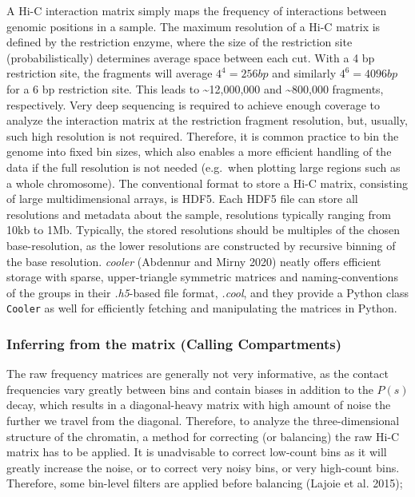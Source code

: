 \documentclass[
  11pt,
  a4paper,
]{scrbook}
\begin{document}
A Hi-C interaction matrix simply maps the frequency of interactions
between genomic positions in a sample. The maximum resolution of a Hi-C
matrix is defined by the restriction enzyme, where the size of the
restriction site (probabilistically) determines average space between
each cut. With a 4 bp restriction site, the fragments will average
\(4^4 = 256 bp\) and similarly \(4^6 = 4096 bp\) for a 6 bp restriction
site. This leads to \textasciitilde12,000,000 and \textasciitilde800,000
fragments, respectively. Very deep sequencing is required to achieve
enough coverage to analyze the interaction matrix at the restriction
fragment resolution, but, usually, such high resolution is not required.
Therefore, it is common practice to bin the genome into fixed bin sizes,
which also enables a more efficient handling of the data if the full
resolution is not needed (e.g.~when plotting large regions such as a
whole chromosome). The conventional format to store a Hi-C matrix,
consisting of large multidimensional arrays, is HDF5. Each HDF5 file can
store all resolutions and metadata about the sample, resolutions
typically ranging from 10kb to 1Mb. Typically, the stored resolutions
should be multiples of the chosen base-resolution, as the lower
resolutions are constructed by recursive binning of the base resolution.
\emph{cooler} (Abdennur and Mirny 2020) neatly offers efficient storage
with sparse, upper-triangle symmetric matrices and naming-conventions of
the groups in their \emph{.h5}-based file format, \emph{.cool}, and they
provide a Python class \texttt{Cooler} as well for efficiently fetching
and manipulating the matrices in Python.

\subsubsection{Inferring from the matrix (Calling
Compartments)}\label{inferring-from-the-matrix-calling-compartments}

The raw frequency matrices are generally not very informative, as the
contact frequencies vary greatly between bins and contain biases in
addition to the \(P(s)\) decay, which results in a diagonal-heavy matrix
with high amount of noise the further we travel from the diagonal.
Therefore, to analyze the three-dimensional structure of the chromatin,
a method for correcting (or balancing) the raw Hi-C matrix has to be
applied. It is unadvisable to correct low-count bins as it will greatly
increase the noise, or to correct very noisy bins, or very high-count
bins. Therefore, some bin-level filters are applied before balancing
(Lajoie et al. 2015);
\end{document}
